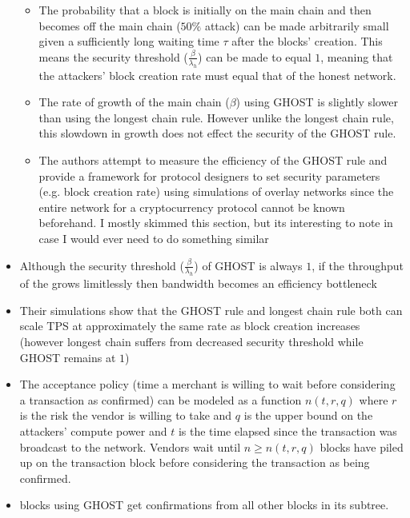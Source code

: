 \documentclass[a4paper]{article}
\begin{document}
\begin{itemize}
\begin{itemize}
\item The probability that a block is initially on the main chain and then becomes off the main chain ($50\%$ attack) can be made arbitrarily small given a sufficiently long waiting time $\tau$ after the blocks' creation. This means the security threshold ($\frac{\beta}{\lambda_h}$) can be made to equal $1$, meaning that the attackers' block creation rate must equal that of the honest network.

\item The rate of growth of the main chain ($\beta$) using GHOST is slightly slower than using the longest chain rule. However unlike the longest chain rule, this slowdown in growth does not effect the security of the GHOST rule.

\item The authors attempt to measure the efficiency of the GHOST rule and provide a framework for protocol designers to set security parameters (e.g. block creation rate) using simulations of overlay networks since the entire network for a cryptocurrency protocol cannot be known beforehand. I mostly skimmed this section, but its interesting to note in case I would ever need to do something similar
\end{itemize}

\item Although the security threshold ($\frac{\beta}{\lambda_h}$) of GHOST is always $1$, if the throughput of the grows limitlessly then bandwidth becomes an efficiency bottleneck

\item Their simulations show that the GHOST rule and longest chain rule both can scale TPS at approximately the same rate as block creation increases (however longest chain suffers from decreased security threshold while GHOST remains at $1$)

\item The acceptance policy (time a merchant is willing to wait before considering a transaction as confirmed) can be modeled as a function $n(t, r, q)$ where $r$ is the risk the vendor is willing to take and $q$ is the upper bound on the attackers' compute power and $t$ is the time elapsed since the transaction was broadcast to the network. Vendors wait until $n \ge n(t, r, q)$ blocks have piled up on the transaction block before considering the transaction as being confirmed.

\item blocks using GHOST get confirmations from all other blocks in its subtree. 


\end{itemize}
\end{document}
